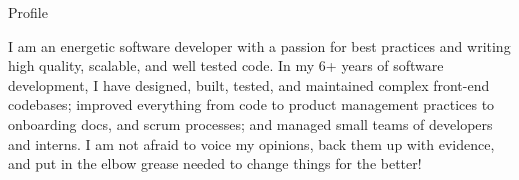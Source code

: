 \documentclass[]{mcdowellcv}
\begin{document}
	\makeheader

	\begin{cvsection}{Profile}
		\vspace{2pt}
		\begin{cvsubsection}{}{}{}
			I am an energetic software developer with a passion for best practices and writing high quality, scalable, and well tested code. In my 6+ years of software development, I have designed, built, tested, and maintained complex front-end codebases; improved everything from code to product management practices to onboarding docs, and scrum processes; and managed small teams of developers and interns. I am not afraid to voice my opinions, back them up with evidence, and put in the elbow grease needed to change things for the better!
		\end{cvsubsection}
	\end{cvsection}
\end{document}
